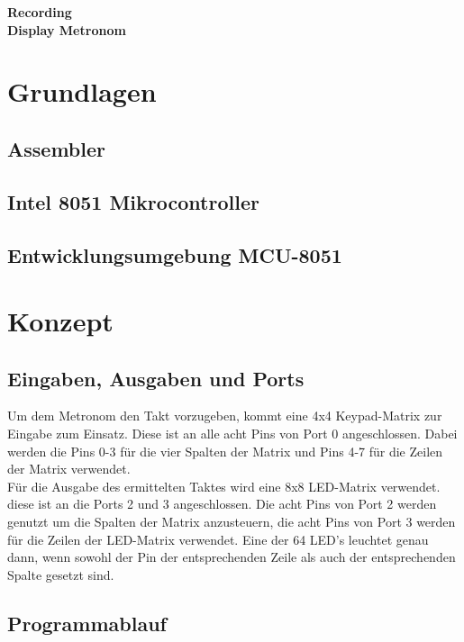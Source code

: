 \documentclass[a4paper, 10pt]{scrartcl}
\begin{document}
\textbf{Recording}
\\
\textbf{Display Metronom}

\section{Grundlagen}
\subsection{Assembler}
\subsection{Intel 8051 Mikrocontroller}
\subsection{Entwicklungsumgebung MCU-8051}

\section{Konzept}
\subsection{Eingaben, Ausgaben und Ports}
Um dem Metronom den Takt vorzugeben, kommt eine 4x4 Keypad-Matrix zur Eingabe zum Einsatz. Diese ist an alle acht Pins von Port 0 angeschlossen. Dabei werden die Pins 0-3 für die vier Spalten der Matrix und Pins 4-7 für die Zeilen der Matrix verwendet. %
\\
Für die Ausgabe des ermittelten Taktes wird eine 8x8 LED-Matrix verwendet. diese ist an die Ports 2 und 3 angeschlossen. Die acht Pins von Port 2 werden genutzt um die Spalten der Matrix anzusteuern, die acht Pins von Port 3 werden für die Zeilen der LED-Matrix verwendet. Eine der 64 LED's leuchtet genau dann, wenn sowohl der Pin der entsprechenden Zeile als auch der entsprechenden Spalte gesetzt sind.

\subsection{Programmablauf}
\end{document}
